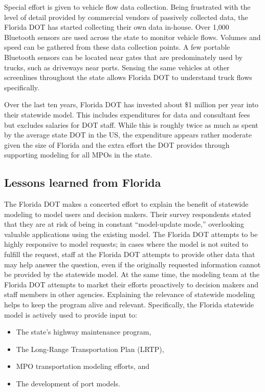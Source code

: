 Special effort is given to vehicle flow data collection. Being frustrated with the level of detail provided by commercial vendors of passively collected data, the Florida DOT has started collecting their own data in-house. Over 1,000 Bluetooth sensors are used across the state to monitor vehicle flows. Volumes and speed can be gathered from these data collection points. A few portable Bluetooth sensors can be located near gates that are predominately used by trucks, such as driveways near ports. Sensing the same vehicles at other screenlines throughout the state allows Florida DOT to understand truck flows specifically.

Over the last ten years, Florida DOT has invested about \$1 million per year into their statewide model. This includes expenditures for data and consultant fees but excludes salaries for DOT staff. While this is roughly twice as much as spent by the average state DOT in the US, the expenditure appears rather moderate given the size of Florida and the extra effort the DOT provides through supporting modeling for all MPOs in the state.

\subsection{Lessons learned from Florida}

The Florida DOT makes a concerted effort to explain the benefit of statewide modeling to model users and decision makers. Their survey respondents stated that they are at risk of being in constant ``model-update mode,'' overlooking valuable applications using the existing model. The Florida DOT attempts to be highly responsive to model requests; in cases where the model is not suited to fulfill the request, staff at the Florida DOT attempts to provide other data that may help answer the question, even if the originally requested information cannot be provided by the statewide model. At the same time, the modeling team at the Florida DOT attempts to market their efforts proactively to decision makers and staff members in other agencies. Explaining the relevance of statewide modeling helps to keep the program alive and relevant. Specifically, the Florida statewide model is actively used to provide input to:

\begin{itemize}
\item The state's highway maintenance program,
\item The Long-Range Transportation Plan (LRTP),
\item MPO transportation modeling efforts, and
\item The development of port models.
\end{itemize}

